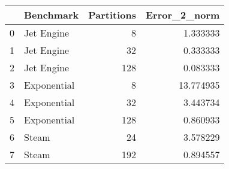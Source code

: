 \begin{tabular}{llrr}
\toprule
{} &    Benchmark &  Partitions &  Error\_2\_norm \\
\midrule
0 &   Jet Engine &           8 &      1.333333 \\
1 &   Jet Engine &          32 &      0.333333 \\
2 &   Jet Engine &         128 &      0.083333 \\
3 &  Exponential &           8 &     13.774935 \\
4 &  Exponential &          32 &      3.443734 \\
5 &  Exponential &         128 &      0.860933 \\
6 &        Steam &          24 &      3.578229 \\
7 &        Steam &         192 &      0.894557 \\
\bottomrule
\end{tabular}
